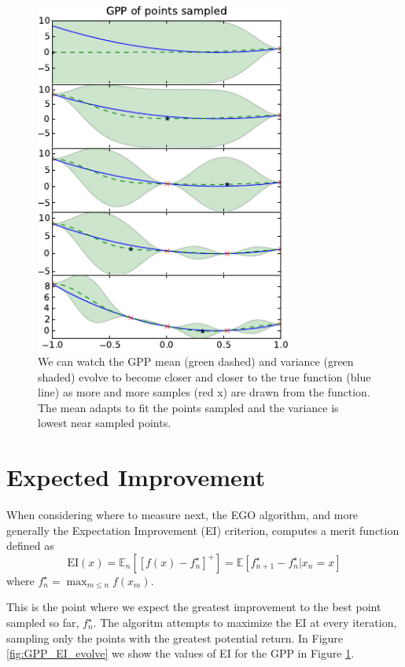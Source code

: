 \documentclass[phd,tocprelim]{cornell}
\begin{document}
\begin{figure}[hpt]
 	\centerline{\includegraphics[width=0.75\textwidth]{figures/EPI/GPP_stepper_EI.png}}
    \caption[Evolution of a GPP]{We can watch the GPP mean (green dashed) and variance (green shaded) evolve to become closer and closer to the true function (blue line) as more and more samples (red x) are drawn from the function. The mean adapts to fit the points sampled and the variance is lowest near sampled points.}
 	\label{fig:GPP_evolve}
\end{figure}

\section{Expected Improvement}

When considering where to measure next, the EGO algorithm, and more generally the Expectation Improvement (EI) criterion, computes a merit function defined as
\begin{equation}
 \mbox{EI}(x) = \mathbb{E}_{n} \left[\left[ f(x) - f_{n}^{\star} \right]^{+} \right] = \mathbb{E} \left[ f_{n+1}^{\star} - f_{n}^{\star} | x_{n} = x\right]
\end{equation}
where $f_{n}^{\star} = \max_{m \leq n} f(x_{m})$.

This is the point where we expect the greatest improvement to the best point sampled so far, $f_{n}^{\star}$. The algoritm attempts to maximize the EI at every iteration, sampling only the points with the greatest potential return. In Figure \ref{fig:GPP_EI_evolve} we show the values of EI for the GPP in Figure \ref{fig:GPP_evolve}.
\end{document}
